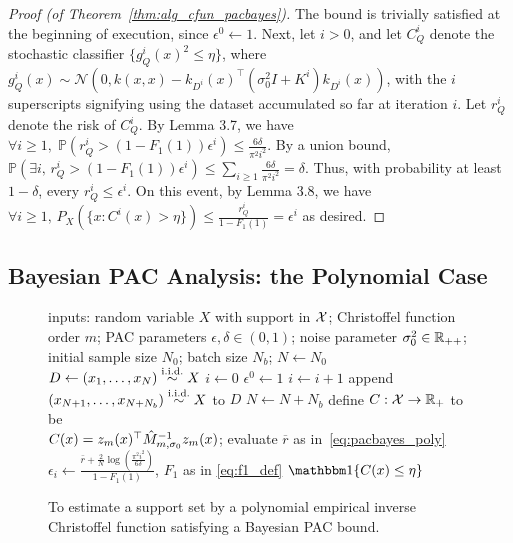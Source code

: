 \documentclass[onefignum,onetabnum]{siamart171218}
\begin{document}
\begin{proof}[Proof (of Theorem~\ref{thm:alg_cfun_pacbayes})]
    The bound is trivially satisfied at the beginning of execution, since
    $\epsilon^0\gets1$. Next, let $i>0$, and let
    $C^i_Q$ denote the stochastic classifier $\{g^i_Q(x)^2 \leq
    \eta\}$, where $g^i_Q(x) \sim \mathcal N(0, k(x,x) - k_{D^i}(x)^\top
    (\sigma_0^2 I + K^i) k_{D^i}(x))$, with the $i$ superscripts signifying
    using the dataset accumulated so far at iteration $i$. Let $r^i_Q$ denote
    the risk of $C^i_Q$.
    By Lemma 3.7, we have
        $\forall i\geq 1,\; \mathbb P(r^i_Q > (1-F_1(1))\epsilon^i) \leq \frac{6\delta}{\pi^2 i^2}$.
        By a union bound,
    $ \mathbb P(\exists i,\, r_Q^i > (1-F_1(1))\epsilon^i) \leq \sum_{i\geq 1} \frac{6\delta}{\pi^2 i^2} = \delta$.
    Thus, with probability at least $1-\delta$, every $r_Q^i \leq \epsilon^i$.
    On this event, by Lemma 3.8, we have 
    $
        \forall i \geq 1,\, P_X(\{x: C^i(x) > \eta\}) \leq \frac{r_Q^i}{1-F_1(1)} = \epsilon^i
    $
    as desired. 
\end{proof}



\subsection{Bayesian PAC Analysis: the Polynomial Case}%
\label{sub:bayesian_pac_analysis_the_polynomial_case}

\begin{figure}
\begin{minipage}[t]{0.46\textwidth}
    \begin{algorithm}[H]
        \caption{To estimate a support set by a polynomial empirical inverse
        Christoffel function satisfying a Bayesian PAC bound.}\label{alg:cfun_pacbayes_poly}
        \begin{algorithmic}
        \STATE inputs: random variable $X$ with support in $\mathcal{X}$; Christoffel function order $m$; PAC parameters
        $\epsilon,\delta\in(0,1)$; noise parameter $\sigma_0^2\in\mathbb{R}_{++}$;
        initial sample size $N_0$; batch size $N_b$;
        \STATE $N\gets N_0$
        \STATE $D\gets (x_1,\dotsc,x_{N})\overset{\textrm{i.i.d.}}{\sim} X$
        \STATE $i\gets0$
        \STATE $\epsilon^0\gets 1$
            \STATE $i\gets i + 1$
            \STATE append \\ $(x_{N+1},\dotsc,x_{N+N_b})\overset{\textrm{i.i.d.}}{\sim} X$ to $D$
            \STATE $N\gets N+N_b$
            \STATE define $C:\mathcal{X}\to\mathbb{R}_{+}$ to be \\
            $C(x)=z_m(x)^\top\hat{M}_{m,\sigma_0}^{-1}z_m(x)$;
            \STATE evaluate $\overline{r}$ as in~\eqref{eq:pacbayes_poly}
            \STATE
            $\epsilon_i \gets \frac{\bar r + \frac{2}{N}\log (\frac{\pi^2i^2}{6
            \delta})}{1-F_1(1)}$, $F_1$ as in \eqref{eq:f1_def}
        \ENDWHILE
        \RETURN $\ind{C(x)\le\eta}$
        \end{algorithmic}
    \end{algorithm}
\end{minipage}
\end{figure}
\end{document}
